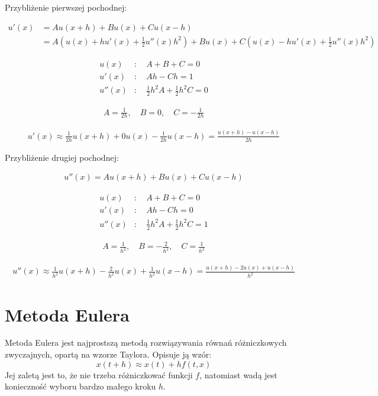 \documentclass[a4paper,12pt]{article}
\begin{document}
Przybliżenie pierwszej pochodnej:

\begin{align*}
    u'(x) &= Au(x+h) + Bu(x) + Cu(x-h) \\
    &= A(u(x) + hu'(x) + \frac{1}{2} u''(x)h^2) + B u(x) + C(u(x) - hu'(x) + \frac{1}{2} u''(x)h^2)
\end{align*}

\begin{align*}
    u(x) &: \quad A + B + C = 0 \\
    u'(x) &: \quad A h - Ch = 1 \\
    u''(x) &: \quad \frac{1}{2} h^2 A + \frac{1}{2} h^2 C = 0
\end{align*}

\begin{align*}
    A = \frac{1}{2h}, \quad B = 0, \quad C = -\frac{1}{2h}
\end{align*}

\begin{align*}
    u'(x) \approx \frac{1}{2h} u(x+h) + 0u(x) - \frac{1}{2h} u(x-h) = \frac{u(x+h) - u(x-h)}{2h}
\end{align*}

Przybliżenie drugiej pochodnej:

\begin{align*}
    u''(x) = A u(x+h) + B u(x) + C u(x-h)
\end{align*}

\begin{align*}
    u(x) &: \quad A + B + C = 0 \\
    u'(x) &: \quad A h - Ch = 0 \\
    u''(x) &: \quad \frac{1}{2} h^2 A + \frac{1}{2} h^2 C = 1
\end{align*}

\begin{align*}
    A = \frac{1}{h^2}, \quad B = -\frac{2}{h^2}, \quad C = \frac{1}{h^2}
\end{align*}

\begin{align*}
    u''(x) \approx \frac{1}{h^2} u(x+h) - \frac{2}{h^2} u(x) + \frac{1}{h^2} u(x-h) = \frac{u(x+h) - 2u(x) + u(x-h)}{h^2}
\end{align*}

\section{Metoda Eulera}
Metoda Eulera jest najprostszą metodą rozwiązywania równań różniczkowych zwyczajnych, opartą na wzorze Taylora. Opisuje ją wzór:
\begin{equation}
x(t+h) \approx x(t) + hf(t,x)
\end{equation}
Jej zaletą jest to, że nie trzeba różniczkować funkcji $f$, natomiast wadą jest konieczność wyboru bardzo małego kroku $h$.
\end{document}
